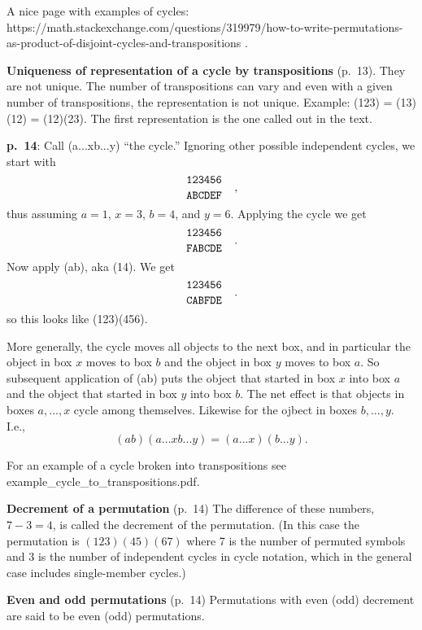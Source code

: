 A nice page with examples of cycles:
https://math.stackexchange.com/questions/319979/how-to-write-permutations-as-product-of-disjoint-cycles-and-transpositions
.

{\bf Uniqueness of representation of a cycle by transpositions}
(p.\ 13). They are not unique. The number of transpositions can vary
and even with a given number of transpositions, the representation is
not unique. Example: (123) = (13)(12) = (12)(23). The first
representation is the one called out in the text.

{\bf p.\ 14}: Call (a...xb...y) ``the cycle.'' Ignoring other possible
independent cycles, we start with
$$
\genfrac{}{}{0pt}0{\tt 123456}{\tt ABCDEF}\quad,
$$
thus assuming $a=1$, $x=3$, $b=4$, and $y=6$. Applying the cycle we get
$$
\genfrac{}{}{0pt}0{\tt 123456}{\tt FABCDE}\quad.
$$
Now apply (ab), aka (14). We get
$$
\genfrac{}{}{0pt}0{\tt 123456}{\tt CABFDE}\quad.
$$
so this looks like (123)(456).

More generally, the cycle moves all objects to the next box, and in
particular the object in box $x$ moves to box $b$ and the object in
box $y$ moves to box $a$. So subsequent application of (ab) puts the
object that started in box $x$ into box $a$ and the object that
started in box $y$ into box $b$. The net effect is that objects in
boxes $a,...,x$ cycle among themselves. Likewise for the ojbect in
boxes $b,...,y$. I.e.,
$$
(ab)(a...xb...y) = (a...x)(b...y).
$$

For an example of a cycle broken into transpositions see
example\_cycle\_to\_transpositions.pdf.

{\bf Decrement of a permutation} (p.\ 14) The difference of these
numbers, $7-3 = 4$, is called the decrement of the permutation. (In
this case the permutation is $(123)(45)(67)$ where 7 is the number of
permuted symbols and 3 is the number of independent cycles in cycle
notation, which in the general case includes single-member cycles.)

{\bf Even and odd permutations} (p.\ 14) Permutations with even (odd)
decrement are said to be even (odd) permutations.

